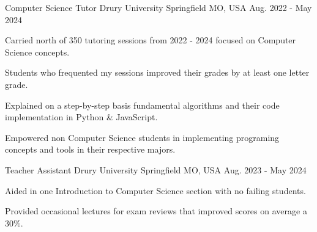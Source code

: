 
\begin{cventries}

  \cventry
    {Computer Science Tutor} %
    {Drury University} %
    {Springfield MO, USA} %
    {Aug. 2022 - May 2024} %
    {
        \begin{cvitems}
            \item{Carried north of 350 tutoring sessions from 2022 - 2024 focused on Computer Science concepts.}
            \item{Students who frequented my sessions improved their grades by at least one letter grade.}
	    \item{Explained on a step-by-step basis fundamental algorithms and their code implementation in Python \& JavaScript.}
            \item{Empowered non Computer Science students in implementing programing concepts and tools in their respective majors.}
	\end{cvitems}
}


  \cventry
    {Teacher Assistant} %
    {Drury University} %
    {Springfield MO, USA} %
    {Aug. 2023 - May 2024} %
    {
      \begin{cvitems} %
	\item {Aided in one Introduction to Computer Science section with no failing students.}
        \item {Provided occasional lectures for exam reviews that improved scores on average a 30\%.}
	\item {}
	\item {}
	\item {}
      \end{cvitems}
    }

\end{cventries}
